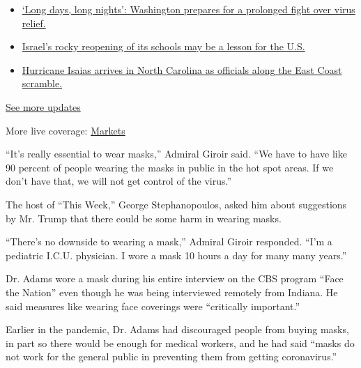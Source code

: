 \begin{itemize}
\tightlist
\item
  \href{https://www.nytimes3xbfgragh.onion/2020/08/04/world/coronavirus-covid-19.html?action=click\&pgtype=Article\&state=default\&region=MAIN_CONTENT_1\&context=storylines_live_updates\#link-6b644638}{`Long
  days, long nights': Washington prepares for a prolonged fight over
  virus relief.}
\item
  \href{https://www.nytimes3xbfgragh.onion/2020/08/04/world/coronavirus-covid-19.html?action=click\&pgtype=Article\&state=default\&region=MAIN_CONTENT_1\&context=storylines_live_updates\#link-7af9fca0}{Israel's
  rocky reopening of its schools may be a lesson for the U.S.}
\item
  \href{https://www.nytimes3xbfgragh.onion/2020/08/04/world/coronavirus-covid-19.html?action=click\&pgtype=Article\&state=default\&region=MAIN_CONTENT_1\&context=storylines_live_updates\#link-33bf9168}{Hurricane
  Isaias arrives in North Carolina as officials along the East Coast
  scramble.}
\end{itemize}

\href{https://www.nytimes3xbfgragh.onion/2020/08/04/world/coronavirus-covid-19.html?action=click\&pgtype=Article\&state=default\&region=MAIN_CONTENT_1\&context=storylines_live_updates}{See
more updates}

More live coverage:
\href{https://www.nytimes3xbfgragh.onion/live/2020/08/04/business/stock-market-today-coronavirus?action=click\&pgtype=Article\&state=default\&region=MAIN_CONTENT_1\&context=storylines_live_updates}{Markets}

``It's really essential to wear masks,'' Admiral Giroir said. ``We have
to have like 90 percent of people wearing the masks in public in the hot
spot areas. If we don't have that, we will not get control of the
virus.''

The host of ``This Week,'' George Stephanopoulos, asked him about
suggestions by Mr. Trump that there could be some harm in wearing masks.

``There's no downside to wearing a mask,'' Admiral Giroir responded.
``I'm a pediatric I.C.U. physician. I wore a mask 10 hours a day for
many many years.''

Dr. Adams wore a mask during his entire interview on the CBS program
``Face the Nation'' even though he was being interviewed remotely from
Indiana. He said measures like wearing face coverings were ``critically
important.''

Earlier in the pandemic, Dr. Adams had discouraged people from buying
masks, in part so there would be enough for medical workers, and he had
said ``masks do not work for the general public in preventing them from
getting coronavirus.''

